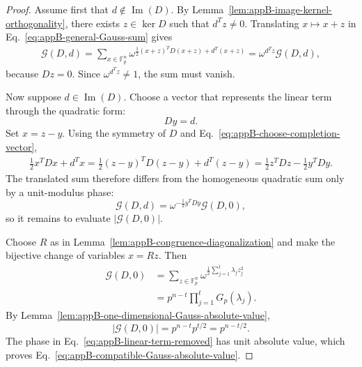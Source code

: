 \documentclass[11pt]{article}
\newcommand{\F}{\mathbb F}
\newcommand{\im}{\operatorname{Im}}
\newcommand{\1}{\mathbf 1}
\theoremstyle{plain}
\theoremstyle{definition}
\theoremstyle{remark}
\begin{document}
\begin{proof}
Assume first that $d\notin\im(D)$.  By
Lemma~\ref{lem:appB-image-kernel-orthogonality}, there exists
$z\in\ker D$ such that $d^Tz\ne0$.  Translating $x\mapsto x+z$ in
Eq.~\eqref{eq:appB-general-Gauss-sum} gives
\begin{align}
  \mathcal G(D,d)
  =\sum_{x\in\F_p^n}
    \omega^{\frac12(x+z)^TD(x+z)+d^T(x+z)}
=\omega^{d^Tz}\mathcal G(D,d),
  \label{eq:appB-translation-cancellation}
\end{align}
because $Dz=0$.  Since $\omega^{d^Tz}\ne1$, the sum must vanish.

Now suppose $d\in\im(D)$.  Choose a vector that represents the linear term
through the quadratic form:
\begin{equation}
  Dy=d.
  \label{eq:appB-choose-completion-vector}
\end{equation}
Set $x=z-y$.  Using the symmetry of $D$ and Eq.~\eqref{eq:appB-choose-completion-vector},
\begin{align}
  \frac12x^TDx+d^Tx
  =\frac12(z-y)^TD(z-y)+d^T(z-y)
  =\frac12z^TDz-\frac12y^TDy.
  \label{eq:appB-complete-the-square}
\end{align}
The translated sum therefore differs from the homogeneous quadratic sum only
by a unit-modulus phase:
\begin{equation}
  \mathcal G(D,d)
  =\omega^{-\frac12y^TDy}\mathcal G(D,0),
  \label{eq:appB-linear-term-removed}
\end{equation}
so it remains to evaluate $\lvert\mathcal G(D,0)\rvert$.

Choose $R$ as in Lemma~\ref{lem:appB-congruence-diagonalization} and make the
bijective change of variables $x=Rz$.  Then
\begin{align}
  \mathcal G(D,0)
  &=\sum_{z\in\F_p^n}
    \omega^{\frac12\sum_{j=1}^t\lambda_jz_j^2}                   \\
  &=p^{n-t}\prod_{j=1}^tG_p(\lambda_j).
  \label{eq:appB-factorized-Gauss-sum}
\end{align}
By Lemma~\ref{lem:appB-one-dimensional-Gauss-absolute-value},
\begin{equation}
  \lvert\mathcal G(D,0)\rvert
  =p^{n-t}p^{t/2}
  =p^{n-t/2}.
  \label{eq:appB-factorized-Gauss-absolute-value}
\end{equation}
The phase in Eq.~\eqref{eq:appB-linear-term-removed} has unit absolute value,
which proves Eq.~\eqref{eq:appB-compatible-Gauss-absolute-value}.
\end{proof}
\end{document}
